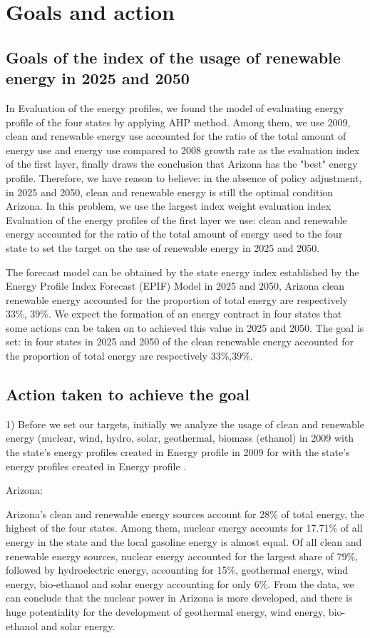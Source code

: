 \section{Goals and action}
\subsection{ Goals of the index of the usage of renewable energy in 2025 and 2050}
In Evaluation of the energy profiles, we found the model of evaluating energy profile of the four states by applying AHP method. Among them, we use 2009, clean and renewable energy use accounted for the ratio of the total amount of energy use and energy use compared to 2008 growth rate as the evaluation index of the first layer, finally draws the conclusion that Arizona has the "best" energy profile. Therefore, we have reason to believe: in the absence of policy adjustment, in 2025 and 2050, clean and renewable energy is still the optimal condition Arizona. In this problem, we use the largest index weight evaluation index Evaluation of the energy profiles of the first layer we use: clean and renewable energy accounted for the ratio of the total amount of energy used to the four state to set the target on the use of renewable energy in 2025 and 2050.


The forecast model can be obtained 
by the state energy index 
established by the 
Energy Profile
Index Forecast
 (EPIF) Model in 2025 and 2050, Arizona clean renewable energy accounted for the proportion of total energy are respectively
 33\%, 39\%. We expect the formation of an energy contract in four states that some actions can be taken on to achieved this value in 2025 and 2050. The goal is set: in four states in 2025 and 2050 of the clean renewable energy accounted for the proportion of total energy are respectively 33\%,39\%.
\subsection{Action taken to achieve the goal}
1) Before we set our targets, initially we analyze the usage of clean and renewable energy (nuclear, wind, hydro, solar, geothermal, biomass (ethanol) in 2009 with the state's energy profiles created in Energy profile in 2009 for with the state's energy profiles created in Energy profile .


Arizona:


Arizona's clean and renewable energy sources account for 28\% of total energy, the highest of the four states. Among them, nuclear energy accounts for 17.71\% of all energy in the state and the local gasoline energy is almost equal. Of all clean and renewable energy sources, nuclear energy accounted for the largest share of 79\%, followed by hydroelectric energy, accounting for 15\%, geothermal energy, wind energy, bio-ethanol and solar energy accounting for only 6\%. From the data, we can conclude that the nuclear power in Arizona is more developed, and there is huge potentiality for the development of geothermal energy, wind energy, bio-ethanol and solar energy.


